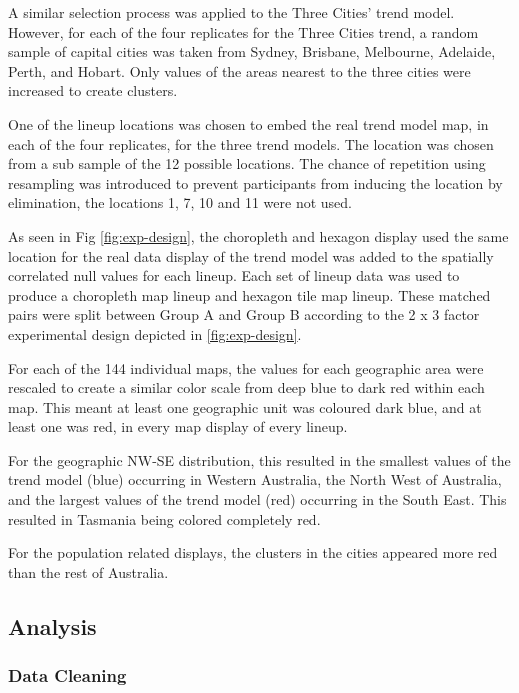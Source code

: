 \documentclass{monashthesis}
\begin{document}
A similar selection process was applied to the Three Cities' trend model. However, for each of the four replicates for the Three Cities trend, a random sample of capital cities was taken from Sydney, Brisbane, Melbourne, Adelaide, Perth, and Hobart. Only values of the areas nearest to the three cities were increased to create clusters.

One of the lineup locations was chosen to embed the real trend model map, in each of the four replicates, for the three trend models.
The location was chosen from a sub sample of the 12 possible locations. The chance of repetition using resampling was introduced to prevent participants from inducing the location by elimination, the locations 1, 7, 10 and 11 were not used.

As seen in Fig \ref{fig:exp-design}, the choropleth and hexagon display used the same location for the real data display of the trend model was added to the spatially correlated null values for each lineup.
Each set of lineup data was used to produce a choropleth map lineup and hexagon tile map lineup. These matched pairs were split between Group A and Group B according to the 2 x 3 factor experimental design depicted in \ref{fig:exp-design}.

For each of the 144 individual maps, the values for each geographic area were rescaled to create a similar color scale from deep blue to dark red within each map.
This meant at least one geographic unit was coloured dark blue, and at least one was red, in every map display of every lineup.

For the geographic NW-SE distribution, this resulted in the smallest values of the trend model (blue) occurring in Western Australia, the North West of Australia, and the largest values of the trend model (red) occurring in the South East. This resulted in Tasmania being colored completely red.

For the population related displays, the clusters in the cities appeared more red than the rest of Australia.

\hypertarget{analysis}{%
\subsection{Analysis}\label{analysis}}

\hypertarget{data-cleaning}{%
\subsubsection{Data Cleaning}\label{data-cleaning}}
\end{document}
